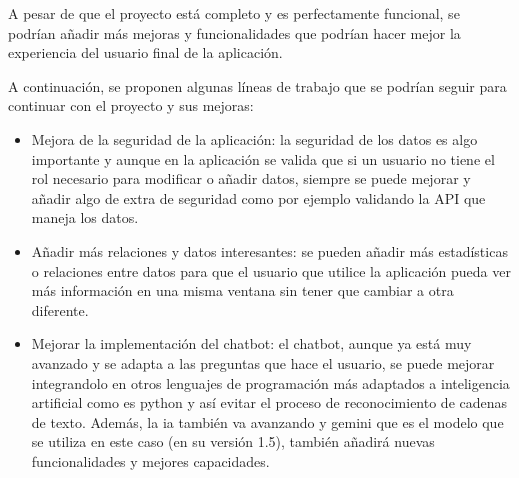 A pesar de que el proyecto está completo y es perfectamente funcional, se podrían añadir más mejoras y funcionalidades que podrían hacer mejor la experiencia del usuario final de la aplicación.

A continuación, se proponen algunas líneas de trabajo que se podrían seguir para continuar con el proyecto y sus mejoras:

\begin{itemize}
    \item Mejora de la seguridad de la aplicación: la seguridad de los datos es algo importante y aunque en la aplicación se valida que si un usuario no tiene el rol necesario para modificar o añadir datos, siempre se puede mejorar y añadir algo de extra de seguridad como por ejemplo validando la API que maneja los datos.
    \item Añadir más relaciones y datos interesantes: se pueden añadir más estadísticas o relaciones entre datos para que el usuario que utilice la aplicación pueda ver más información en una misma ventana sin tener que cambiar a otra diferente.
    \item Mejorar la implementación del chatbot: el chatbot, aunque ya está muy avanzado y se adapta a las preguntas que hace el usuario, se puede mejorar integrandolo en otros lenguajes de programación más adaptados a inteligencia artificial como es python y así evitar el proceso de reconocimiento de cadenas de texto. Además, la ia también va avanzando y gemini que es el modelo que se utiliza en este caso (en su versión 1.5), también añadirá nuevas funcionalidades y mejores capacidades.
\end{itemize}
